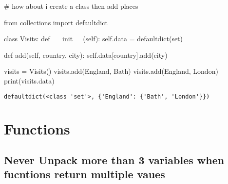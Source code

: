 \documentclass[
]{report}
\newenvironment{Shaded}{\begin{snugshade}}{\end{snugshade}}
\newcommand{\BuiltInTok}[1]{\textcolor[rgb]{0.00,0.23,0.31}{#1}}
\newcommand{\CommentTok}[1]{\textcolor[rgb]{0.37,0.37,0.37}{#1}}
\newcommand{\FunctionTok}[1]{\textcolor[rgb]{0.28,0.35,0.67}{#1}}
\newcommand{\ImportTok}[1]{\textcolor[rgb]{0.00,0.46,0.62}{#1}}
\newcommand{\KeywordTok}[1]{\textcolor[rgb]{0.00,0.23,0.31}{#1}}
\newcommand{\NormalTok}[1]{\textcolor[rgb]{0.00,0.23,0.31}{#1}}
\newcommand{\OperatorTok}[1]{\textcolor[rgb]{0.37,0.37,0.37}{#1}}
\newcommand{\StringTok}[1]{\textcolor[rgb]{0.13,0.47,0.30}{#1}}
\newcommand{\VariableTok}[1]{\textcolor[rgb]{0.07,0.07,0.07}{#1}}
\begin{document}
\begin{Shaded}
\begin{Highlighting}[]
\CommentTok{\# how about i create a class then add places}

\ImportTok{from}\NormalTok{ collections }\ImportTok{import}\NormalTok{ defaultdict}

\KeywordTok{class}\NormalTok{ Visits:}
    \KeywordTok{def} \FunctionTok{\_\_init\_\_}\NormalTok{(}\VariableTok{self}\NormalTok{):}
       \VariableTok{self}\NormalTok{.data }\OperatorTok{=}\NormalTok{ defaultdict(}\BuiltInTok{set}\NormalTok{)}

    \KeywordTok{def}\NormalTok{ add(}\VariableTok{self}\NormalTok{, country, city):}
       \VariableTok{self}\NormalTok{.data[country].add(city)}

\NormalTok{visits }\OperatorTok{=}\NormalTok{ Visits()}
\NormalTok{visits.add(}\StringTok{\textquotesingle{}England\textquotesingle{}}\NormalTok{, }\StringTok{\textquotesingle{}Bath\textquotesingle{}}\NormalTok{)}
\NormalTok{visits.add(}\StringTok{\textquotesingle{}England\textquotesingle{}}\NormalTok{, }\StringTok{\textquotesingle{}London\textquotesingle{}}\NormalTok{)}
\BuiltInTok{print}\NormalTok{(visits.data)}
\end{Highlighting}
\end{Shaded}

\begin{verbatim}
defaultdict(<class 'set'>, {'England': {'Bath', 'London'}})
\end{verbatim}

\hypertarget{functions}{%
\section{Functions}\label{functions}}

\hypertarget{never-unpack-more-than-3-variables-when-fucntions-return-multiple-vaues}{%
\subsection{Never Unpack more than 3 variables when fucntions return
multiple
vaues}\label{never-unpack-more-than-3-variables-when-fucntions-return-multiple-vaues}}
\end{document}
